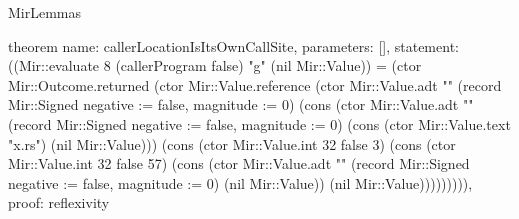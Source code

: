 \begin{lexlean}{MirLemmas}
\begin{semanticmodule}
theorem{
  name: callerLocationIsItsOwnCallSite,
  parameters: [],
  statement: ((Mir::evaluate 8 (callerProgram false) "g" (nil Mir::Value)) = (ctor Mir::Outcome.returned (ctor Mir::Value.reference (ctor Mir::Value.adt "" (record Mir::Signed {negative := false, magnitude := 0}) (cons (ctor Mir::Value.adt "" (record Mir::Signed {negative := false, magnitude := 0}) (cons (ctor Mir::Value.text "x.rs") (nil Mir::Value))) (cons (ctor Mir::Value.int 32 false 3) (cons (ctor Mir::Value.int 32 false 57) (cons (ctor Mir::Value.adt "" (record Mir::Signed {negative := false, magnitude := 0}) (nil Mir::Value)) (nil Mir::Value))))))))),
  proof: reflexivity{}
}
\end{semanticmodule}
\end{lexlean}
